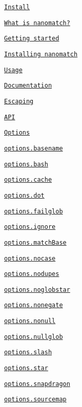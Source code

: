 \begin{DoxyItemize}
\item \href{#install}{\tt Install}
\item \href{#what-is-nanomatch}{\tt What is nanomatch?}
\item \href{#getting-started}{\tt Getting started}
\begin{DoxyItemize}
\item \href{#installing-nanomatch}{\tt Installing nanomatch}
\item \href{#usage}{\tt Usage}
\end{DoxyItemize}
\item \href{#documentation}{\tt Documentation}
\begin{DoxyItemize}
\item \href{#escaping}{\tt Escaping}
\end{DoxyItemize}
\item \href{#api}{\tt A\+PI}
\item \href{#options}{\tt Options}
\begin{DoxyItemize}
\item \href{#optionsbasename}{\tt options.\+basename}
\item \href{#optionsbash}{\tt options.\+bash}
\item \href{#optionscache}{\tt options.\+cache}
\item \href{#optionsdot}{\tt options.\+dot}
\item \href{#optionsfailglob}{\tt options.\+failglob}
\item \href{#optionsignore}{\tt options.\+ignore}
\item \href{#optionsmatchbase}{\tt options.\+match\+Base}
\item \href{#optionsnocase}{\tt options.\+nocase}
\item \href{#optionsnodupes}{\tt options.\+nodupes}
\item \href{#optionsnoglobstar}{\tt options.\+noglobstar}
\item \href{#optionsnonegate}{\tt options.\+nonegate}
\item \href{#optionsnonull}{\tt options.\+nonull}
\item \href{#optionsnullglob}{\tt options.\+nullglob}
\item \href{#optionsslash}{\tt options.\+slash}
\item \href{#optionsstar}{\tt options.\+star}
\item \href{#optionssnapdragon}{\tt options.\+snapdragon}
\item \href{#optionssourcemap}{\tt options.\+sourcemap}

\end{DoxyItemize}
\end{DoxyItemize}
